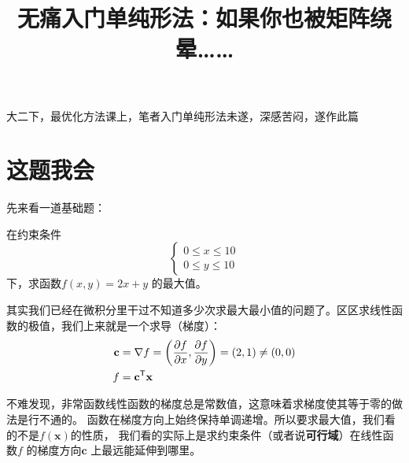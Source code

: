 \documentclass{../mathnotes-art}
\title{无痛入门单纯形法：如果你也被矩阵绕晕……}
\renewcommand{\c}{\mathbf{c}}
\newcommand{\x}{\mathbf{x}}
\begin{document}
\maketitle
\tableofcontents

大二下，最优化方法课上，笔者入门单纯形法未遂，深感苦闷，遂作此篇

\section{这题我会}

先来看一道基础题：
\begin{example}
    在约束条件
    \[
        \begin{cases}
            0 \leq x \leq 10 \\
            0 \leq y \leq 10
        \end{cases}
    \]
    下，求函数\(f(x,y) = 2x + y\) 的最大值。
\end{example}

其实我们已经在微积分里干过不知道多少次求最大最小值的问题了。区区求线性函数的极值，我们上来就是一个求导（梯度）：
\begin{align*}
    \c &= \nabla f =\left( \pdv{f}{x}, \pdv{f}{y} \right) = (2,1) \neq (0,0)\\
    f &= \c^{\mathsf{T}} \x
\end{align*}

不难发现，非常函数线性函数的梯度总是常数值，这意味着求梯度使其等于零的做法是行不通的。
函数在梯度方向上始终保持单调递增。所以要求最大值，我们看的不是\(f(\x)\)的性质，
我们看的实际上是求约束条件（或者说\textbf{可行域}）在线性函数\(f\)
的梯度方向\(\c\) 上最远能延伸到哪里。
\end{document}
